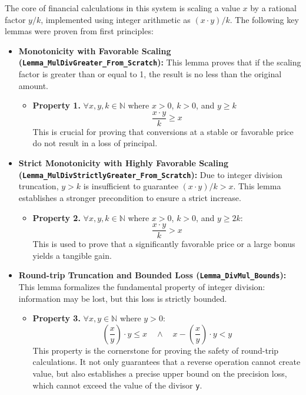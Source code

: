 \documentclass[
  english,
  onecolumn]{article}
\providecommand{\tightlist}{%
  \setlength{\itemsep}{0pt}\setlength{\parskip}{0pt}}
\begin{document}
The core of financial calculations in this system is scaling a value
\(x\) by a rational factor \(y/k\), implemented using integer arithmetic
as \((x \cdot y) / k\). The following key lemmas were proven from first
principles:

\begin{itemize}
\item
  \textbf{Monotonicity with Favorable Scaling
  (\texttt{Lemma\_MulDivGreater\_From\_Scratch}):} This lemma proves
  that if the scaling factor is greater than or equal to 1, the result
  is no less than the original amount.

  \begin{itemize}
  \tightlist
  \item
    \textbf{Property 1.} \(\forall x, y, k \in \mathbb{N}\) where
    \(x > 0\), \(k > 0\), and \(y \ge k\) \[\frac{x \cdot y}{k} \ge x\]
    This is crucial for proving that conversions at a stable or
    favorable price do not result in a loss of principal.
  \end{itemize}
\item
  \textbf{Strict Monotonicity with Highly Favorable Scaling
  (\texttt{Lemma\_MulDivStrictlyGreater\_From\_Scratch}):} Due to
  integer division truncation, \(y > k\) is insufficient to guarantee
  \((x \cdot y) / k > x\). This lemma establishes a stronger
  precondition to ensure a strict increase.

  \begin{itemize}
  \tightlist
  \item
    \textbf{Property 2.} \(\forall x, y, k \in \mathbb{N}\) where
    \(x > 0\), \(k > 0\), and \(y \ge 2k\):\\
    \[\frac{x \cdot y}{k} > x\] This is used to prove that a
    significantly favorable price or a large bonus yields a tangible
    gain.
  \end{itemize}
\item
  \textbf{Round-trip Truncation and Bounded Loss
  (\texttt{Lemma\_DivMul\_Bounds}):} This lemma formalizes the
  fundamental property of integer division: information may be lost, but
  this loss is strictly bounded.

  \begin{itemize}
  \tightlist
  \item
    \textbf{Property 3.} \(\forall x, y \in \mathbb{N}\) where
    \(y > 0\):
    \[ \left( \frac{x}{y} \right) \cdot y \le x \quad \land \quad x - \left( \frac{x}{y} \right) \cdot y < y \]
    This property is the cornerstone for proving the safety of
    round-trip calculations. It not only guarantees that a reverse
    operation cannot create value, but also establishes a precise upper
    bound on the precision loss, which cannot exceed the value of the
    divisor \texttt{y}.
  \end{itemize}
\end{itemize}
\end{document}
